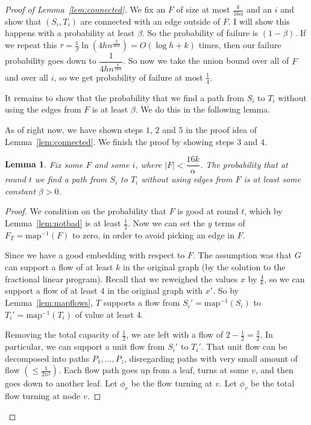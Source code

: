 \documentclass[12pt]{article}
\newtheorem{lemma}{Lemma}
\begin{document}
\begin{proof}[Proof of Lemma~\ref{lem:connected}]
We fix an $F$ of size at most $\frac{k}{16\alpha}$ and an $i$ and show that $(S_i, T_i)$ are connected with an edge outside of $F$. I will show this happens with a probability at least $\beta$. So the probability of failure is $(1-\beta)$. If we repeat this $\tau = \frac{1}{\beta}\ln(4hn^{\frac{k}{16\alpha}}) = O(\log h + k)$ times, then our failure probability goes down to $\dfrac{1}{4hn^{\frac{k}{16\alpha}}}$. So now we take the union bound over all of $F$ and over all $i$, so we get probability of failure at most $\frac{1}{4}$.

It remains to show that the probability that we find a path from $S_i$ to $T_i$ without using the edges from $F$ is at least $\beta$. We do this in the following lemma.

As of right now, we have shown steps $1$, $2$ and $5$ in the proof idea of Lemma~\ref{lem:connected}. We finish the proof by showing steps $3$ and $4$. 

\begin{lemma}
Fix some $F$ and some $i$, where $|F| < \dfrac{16k}{\alpha}$. The probability that at round $t$ we find a path from $S_i$ to $T_i$ without using edges from $F$ is at least some constant $\beta > 0$. 
\end{lemma}

\begin{proof}
We condition on the probability that $F$ is good at round $t$, which by Lemma~\ref{lem:notbad} is at least $\frac{1}{2}$. Now we can set the $y$ terms of $F_T = \text{map}^{-1}(F)$ to zero, in order to avoid picking an edge in $F$. 

Since we have a good embedding with respect to $F$. The assumption was that $G$ can support a flow of at least $k$ in the original graph (by the solution to the fractional linear program). Recall that we reweighed the values $x$ by $\frac{4}{k}$, so we can support a flow of at least $4$ in the original graph with $x'$. So by Lemma~\ref{lem:mapflows}, $T$ supports a flow from $S_i' = \text{map}^{-1}(S_i)$ to $T_i' = \text{map}^{-1}(T_i)$ of value at least $4$. 

Removing the total capacity of $\frac{1}{2}$, we are left with a flow of $2 - \frac{1}{2} = \frac{3}{2}$. In particular, we can support a unit flow from $S_i'$ to $T_i'$. That unit flow can be decomposed into paths $P_1, ..., P_z$, disregarding paths with very small amount of flow $(\leq \frac{1}{2n^2})$. Each flow path goes up from a leaf, turns at some $v$, and then goes down to another leaf. Let $\phi_v$ be the flow turning at $v$. Let $\phi_v$ be the total flow turning at node $v$. 


\end{proof}
\end{proof}
\end{document}
